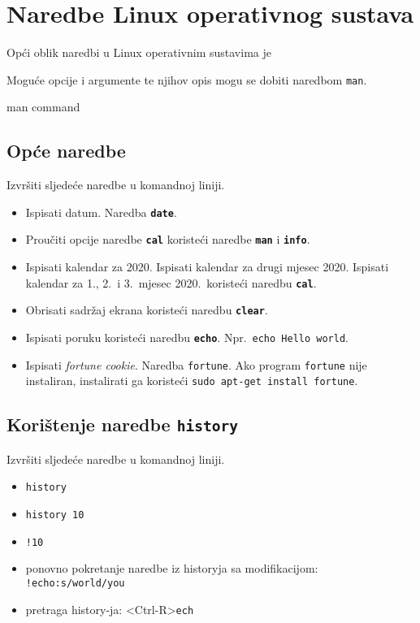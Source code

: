 \section{Naredbe Linux operativnog sustava}
Opći oblik naredbi u Linux operativnim sustavima je
Moguće opcije i argumente te njihov opis mogu se dobiti naredbom \lstinline!man!.
\begin{prototip}
man command 
\end{prototip}


\subsection*{Opće naredbe}
\begin{zadatak}
Izvršiti sljedeće naredbe u komandnoj liniji.
\begin{itemize}
\item Ispisati datum. Naredba \textbf{\texttt{date}}.
\item Proučiti opcije naredbe \textbf{\texttt{cal}} koristeći naredbe \textbf{\texttt{man}} i \textbf{\texttt{info}}.
\item Ispisati kalendar za 2020. Ispisati kalendar za drugi mjesec 2020. Ispisati kalendar za 1., 2.~i 3.~mjesec 2020.~koristeći naredbu \textbf{\texttt{cal}}.
\item Obrisati sadržaj ekrana koristeći naredbu \textbf{\texttt{clear}}.
\item Ispisati poruku koristeći naredbu \textbf{\texttt{echo}}. Npr.~\texttt{echo Hello world}.
\item Ispisati \textit{fortune cookie}. Naredba \texttt{fortune}. Ako program \lstinline!fortune! nije instaliran, instalirati ga koristeći \lstinline!sudo apt-get install fortune!. 
\end{itemize}
\end{zadatak}
\subsection*{Korištenje naredbe \texttt{history}}
\begin{zadatak}
Izvršiti sljedeće naredbe u komandnoj liniji.
\begin{itemize}
\item \texttt{history}
\item \texttt{history 10}
\item \texttt{!10}
\item ponovno pokretanje naredbe iz historyja sa modifikacijom: \texttt{!echo:s/world/you}
\item pretraga history-ja: <Ctrl-R>\texttt{ech}
\end{itemize}
\end{zadatak}
